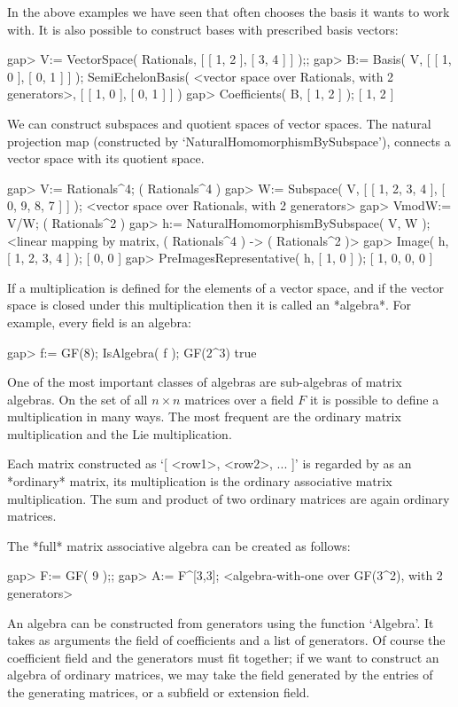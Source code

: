 In the above examples we have seen that {\GAP} often chooses the basis
it wants to work with. It is also possible to construct bases with
prescribed basis vectors:

\beginexample
gap> V:= VectorSpace( Rationals, [ [ 1, 2 ], [ 3, 4 ] ] );; 
gap> B:= Basis( V, [ [ 1, 0 ], [ 0, 1 ] ] );
SemiEchelonBasis( <vector space over Rationals, with 2 generators>,
[ [ 1, 0 ], [ 0, 1 ] ] )
gap> Coefficients( B, [ 1, 2 ] );
[ 1, 2 ]
\endexample

We can construct subspaces and quotient spaces of vector spaces. The
natural projection map (constructed by `NaturalHomomorphismBySubspace'),
connects a vector space with its quotient space.

\beginexample
gap> V:= Rationals^4;
( Rationals^4 )
gap> W:= Subspace( V, [ [ 1, 2, 3, 4 ], [ 0, 9, 8, 7 ] ] );
<vector space over Rationals, with 2 generators>
gap> VmodW:= V/W;
( Rationals^2 )
gap> h:= NaturalHomomorphismBySubspace( V, W );
<linear mapping by matrix, ( Rationals^4 ) -> ( Rationals^2 )>
gap> Image( h, [ 1, 2, 3, 4 ] );
[ 0, 0 ]
gap> PreImagesRepresentative( h, [ 1, 0 ] );
[ 1, 0, 0, 0 ]
\endexample



If a multiplication is defined for the elements of a vector space,
and if the vector space is closed under this multiplication then it is
called an *algebra*. For example, every field is an algebra:

\beginexample
gap> f:= GF(8); IsAlgebra( f );
GF(2^3)
true
\endexample

One of the most important classes of algebras are sub-algebras of matrix
algebras. On the set of all $n\times n$ matrices over a field $F$ 
it is possible to define a multiplication in many ways.
The most frequent are the ordinary matrix multiplication and the Lie
multiplication.

Each matrix constructed as `[ <row1>, <row2>, ... ]' is regarded by {\GAP}
as an *ordinary* matrix, its multiplication is the ordinary associative
matrix multiplication.
The sum and product of two ordinary matrices are again ordinary matrices.

The *full* matrix associative algebra can be created as follows:

\beginexample
gap> F:= GF( 9 );;
gap> A:= F^[3,3];
<algebra-with-one over GF(3^2), with 2 generators>
\endexample

An algebra can be constructed from generators using the function `Algebra'.
It takes as arguments the field of coefficients and a list of generators.
Of course the coefficient field and the generators must fit together;
if we want to construct an algebra of ordinary matrices,
we may take the field generated by the entries of the generating matrices,
or a subfield or extension field.

